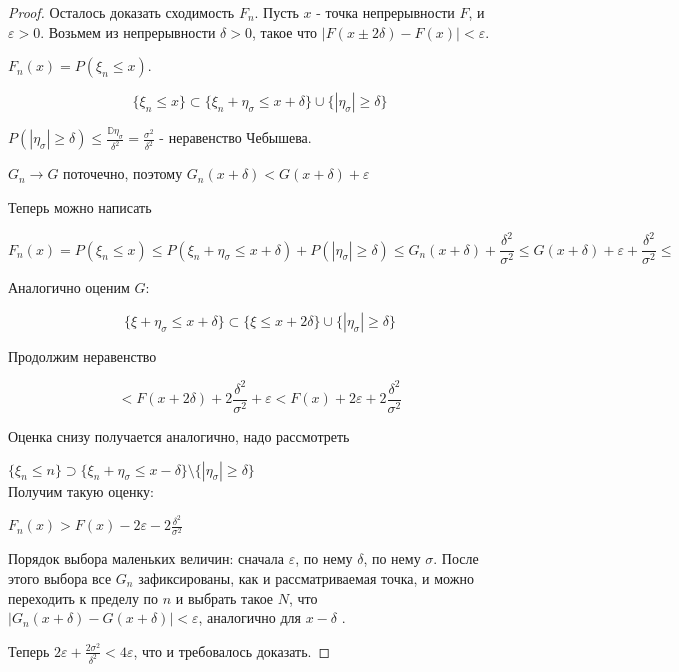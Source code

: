 \begin{proof}
    Осталось доказать сходимость $F_n$. Пусть $x$ - точка непрерывности $F$, и $\varepsilon > 0$. Возьмем из непрерывности $\delta > 0$, такое что $|F(x \pm 2\delta) - F(x)| < \varepsilon$.
    
    $F_n(x) = P(\xi_n \leq x)$. 
    
    \[ \{\xi_n \leq x\} \subset \{\xi_n + \eta_\sigma \leq x + \delta \} \cup \{ |\eta_\sigma| \geq \delta\}\]

    $P(|\eta_\sigma| \geq \delta) \leq \frac{\mathbb{D} \eta_\sigma}{\delta^2} = \frac{\sigma^2}{\delta^2}$ - неравенство Чебышева.
    
    $G_n \to G$ поточечно, поэтому $G_n(x + \delta) < G(x+\delta) + \varepsilon$
    
    Теперь можно написать
    
    \[  F_n(x) = P(\xi_n \leq x) \leq P(\xi_n + \eta_\sigma \leq x + \delta) + P(|\eta_\sigma| \geq \delta) \leq G_n(x+\delta) + \frac{\delta^2}{\sigma^2} \leq G(x+\delta) + \varepsilon +  \frac{\delta^2}{\sigma^2} \leq
    \]
    
    Аналогично оценим $G$:
    
    \[ \{\xi + \eta_\sigma \leq x + \delta\} \subset \{\xi \leq x + 2\delta \} \cup \{ |\eta_\sigma| \geq \delta\}
    \]
    
    Продолжим неравенство
    
    \[ < F(x + 2\delta) + 2\frac{\delta^2}{\sigma^2} + \varepsilon < F(x) + 2\varepsilon + 2\frac{\delta^2}{\sigma^2}
    \]
    
    
    Оценка снизу получается аналогично, надо рассмотреть
    
    $\{\xi_n \leq n\} \supset \{\xi_n + \eta_\sigma \leq x - \delta\} \setminus \{|\eta_\sigma| \geq \delta\}$\\
    
    Получим такую оценку:
    
    $F_n(x) > F(x) - 2\varepsilon - 2\frac{\delta^2}{\sigma^2}$
    
    Порядок выбора маленьких величин: сначала $\varepsilon$, по нему $\delta$, по нему $\sigma$. После этого выбора все $G_n$ зафиксированы, как и рассматриваемая точка, и можно переходить к пределу по $n$ и выбрать такое $N$, что $|G_n(x+\delta) - G(x + \delta)| < \varepsilon$, аналогично для $x-\delta$ .
    
    Теперь $2\varepsilon + \frac{2\sigma^2}{\delta^2} < 4\varepsilon$, что и требовалось доказать.
    
\end{proof}
